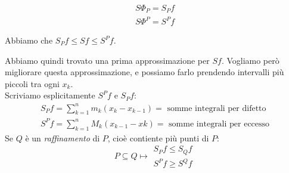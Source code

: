 \begin{notazione}[]
    \begin{gather}
        S\Phi_P=S_Pf \\
        S\Phi^P=S^Pf
    \end{gather}
\end{notazione}

\begin{osservazione}[]
    Abbiamo che $S_Pf\leq Sf\leq S^Pf$.
\end{osservazione}

Abbiamo quindi trovato una prima approssimazione per $Sf$. Vogliamo però migliorare questa approssimazione, e possiamo farlo prendendo intervalli più piccoli tra ogni $x_k$. \\
Scriviamo esplicitamente $S^Pf$ e $S_Pf$:
\begin{gather}
    S_Pf=\sum_{k=1}^{n}m_k(x _k - x _{k-1}) = \text{ somme integrali per difetto}\\
    S^Pf=\sum_{k=1}^{n}M_k(x _{k-1} - x k) = \text{ somme integrali per eccesso}
\end{gather}
Se $Q$ è un \textit{raffinamento} di $P$, cioè contiente più punti di $P$:
\begin{equation}
    P\subseteq Q \mapsto \begin{matrix}S_Pf\leq S_Qf \\ S^Pf\geq S^Qf\end{matrix}
\end{equation}

